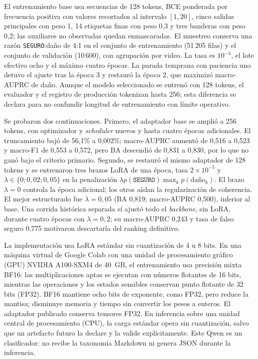 El entrenamiento base usa secuencias de 128 tokens, BCE ponderada por frecuencia positiva con valores recortados al intervalo $[1,20]$, cinco salidas principales con peso 1, 14 etiquetas finas con peso 0,3 y tres banderas con peso 0,2; las auxiliares no observadas quedan enmascaradas. El muestreo conserva una razón \texttt{SEGURO}:daño de 4:1 en el conjunto de entrenamiento (51\,205 filas) y el conjunto de validación (10\,600), con agrupación por video. La tasa es $10^{-4}$, el lote efectivo ocho y el máximo cuatro épocas. La parada temprana con paciencia uno detuvo el ajuste tras la época 3 y restauró la época 2, que maximizó macro-AUPRC de daño. Aunque el modelo seleccionado se entrenó con 128 tokens, el evaluador y el registro de producción tokenizan hasta 256; esta diferencia se declara para no confundir longitud de entrenamiento con límite operativo.

Se probaron dos continuaciones. Primero, el adaptador base se amplió a 256 tokens, con optimizador y \emph{scheduler} nuevos y hasta cuatro épocas adicionales. El truncamiento bajó de 56,1\% a 0,002\%; macro-AUPRC aumentó de 0,516 a 0,523 y macro-F1 de 0,553 a 0,572, pero BA descendió de 0,831 a 0,830, por lo que no ganó bajo el criterio primario. Segundo, se restauró el mismo adaptador de 128 tokens y se entrenaron tres brazos LoRA de una época, tasa $2\times10^{-5}$ y $\lambda\in\{0;0,02;0,05\}$ en la penalización $\lambda p(\texttt{SEGURO})\max_kp(\text{daño}_k)$. El brazo $\lambda=0$ controla la época adicional; los otros aíslan la regularización de coherencia. El mejor estructurado fue $\lambda=0,05$ (BA 0,819; macro-AUPRC 0,500), inferior al base. Una corrida histórica separada sí ajustó todo el \emph{backbone}, sin LoRA, durante cuatro épocas con $\lambda=0,2$; su macro-AUPRC 0,243 y tasa de falso seguro 0,775 motivaron descartarla del ranking definitivo.

La implementación usa LoRA estándar sin cuantización de 4 u 8 bits. En una máquina virtual de Google Colab con una unidad de procesamiento gráfico (GPU) NVIDIA A100-SXM4 de 40~GB, el entrenamiento usa precisión mixta BF16: las multiplicaciones aptas se ejecutan con números flotantes de 16 bits, mientras las operaciones y los estados sensibles conservan punto flotante de 32 bits (FP32). BF16 mantiene ocho bits de exponente, como FP32, pero reduce la mantisa; disminuye memoria y tiempo sin convertir los pesos a enteros. El adaptador publicado conserva tensores FP32. En inferencia sobre una unidad central de procesamiento (CPU), la carga estándar opera sin cuantización, salvo que un artefacto futuro la declare y la valide explícitamente. Este Qwen es un clasificador: no recibe la taxonomía Markdown ni genera JSON durante la inferencia.

